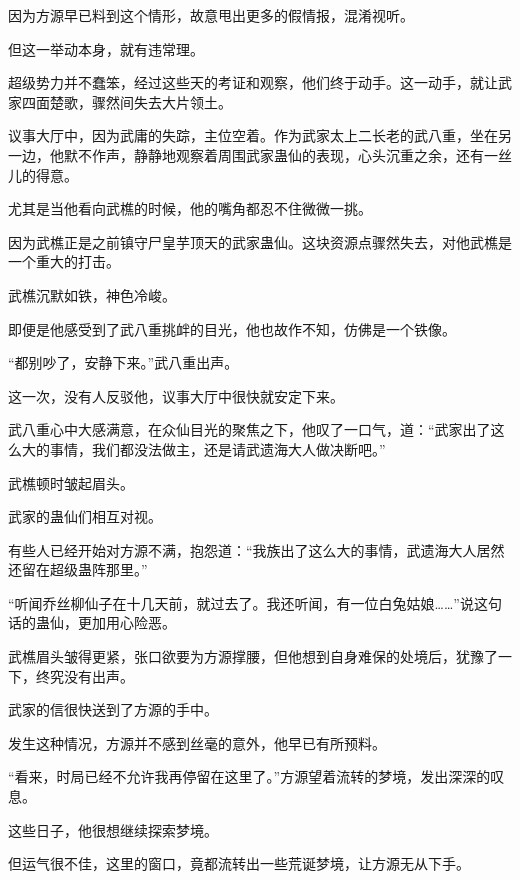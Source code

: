 \begin{this_body}
因为方源早已料到这个情形，故意甩出更多的假情报，混淆视听。

但这一举动本身，就有违常理。

超级势力并不蠢笨，经过这些天的考证和观察，他们终于动手。这一动手，就让武家四面楚歌，骤然间失去大片领土。

议事大厅中，因为武庸的失踪，主位空着。作为武家太上二长老的武八重，坐在另一边，他默不作声，静静地观察着周围武家蛊仙的表现，心头沉重之余，还有一丝儿的得意。

尤其是当他看向武樵的时候，他的嘴角都忍不住微微一挑。

因为武樵正是之前镇守尸皇芋顶天的武家蛊仙。这块资源点骤然失去，对他武樵是一个重大的打击。

武樵沉默如铁，神色冷峻。

即便是他感受到了武八重挑衅的目光，他也故作不知，仿佛是一个铁像。

“都别吵了，安静下来。”武八重出声。

这一次，没有人反驳他，议事大厅中很快就安定下来。

武八重心中大感满意，在众仙目光的聚焦之下，他叹了一口气，道：“武家出了这么大的事情，我们都没法做主，还是请武遗海大人做决断吧。”

武樵顿时皱起眉头。

武家的蛊仙们相互对视。

有些人已经开始对方源不满，抱怨道：“我族出了这么大的事情，武遗海大人居然还留在超级蛊阵那里。”

“听闻乔丝柳仙子在十几天前，就过去了。我还听闻，有一位白兔姑娘……”说这句话的蛊仙，更加用心险恶。

武樵眉头皱得更紧，张口欲要为方源撑腰，但他想到自身难保的处境后，犹豫了一下，终究没有出声。

武家的信很快送到了方源的手中。

发生这种情况，方源并不感到丝毫的意外，他早已有所预料。

“看来，时局已经不允许我再停留在这里了。”方源望着流转的梦境，发出深深的叹息。

这些日子，他很想继续探索梦境。

但运气很不佳，这里的窗口，竟都流转出一些荒诞梦境，让方源无从下手。

\end{this_body}

